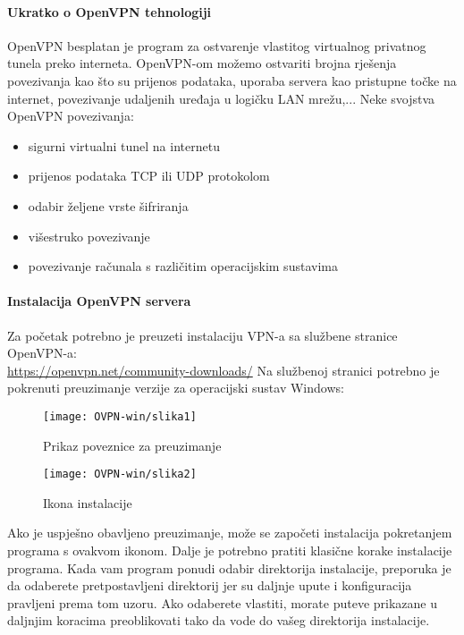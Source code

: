 \bigbreak
\paragraph*{Ukratko o OpenVPN tehnologiji}
\hfill \smallbreak

OpenVPN\cite{openvpn} besplatan je program za ostvarenje vlastitog virtualnog privatnog tunela preko interneta. OpenVPN-om možemo ostvariti brojna rješenja povezivanja kao što su prijenos podataka, uporaba servera kao pristupne točke na internet, povezivanje udaljenih uređaja u logičku LAN mrežu,...\smallbreak
Neke svojstva OpenVPN povezivanja:
\begin{itemize}
	\item sigurni virtualni tunel na internetu
	\item prijenos podataka TCP ili UDP protokolom
	\item odabir željene vrste šifriranja
	\item višestruko povezivanje
	\item povezivanje računala s različitim operacijskim sustavima
\end{itemize}

\bigbreak
\paragraph*{Instalacija OpenVPN servera}
\hfill \bigbreak
Za početak potrebno je preuzeti instalaciju VPN-a sa službene stranice OpenVPN-a:\\ \url{https://openvpn.net/community-downloads/}
\hfill \smallbreak
Na službenoj stranici potrebno je pokrenuti preuzimanje verzije za operacijski sustav Windows:
\begin{figure}[h!]
	\centering
     \texttt{[image: OVPN-win/slika1]}
     \caption{Prikaz poveznice za preuzimanje}
\end{figure}
\FloatBarrier
\begin{wrapfigure}{r}{0.4\textwidth}
  \begin{center}
    \texttt{[image: OVPN-win/slika2]}
    \caption{Ikona instalacije}
  \end{center}
\end{wrapfigure}
\FloatBarrier
Ako je uspješno obavljeno preuzimanje, može se započeti instalacija pokretanjem programa s ovakvom ikonom.
\bigbreak
Dalje je potrebno pratiti klasične korake instalacije programa. Kada vam program ponudi odabir direktorija instalacije, preporuka je da odaberete pretpostavljeni direktorij jer su daljnje upute i konfiguracija pravljeni prema tom uzoru. Ako odaberete vlastiti, morate puteve prikazane u daljnjim koracima preoblikovati tako da vode do vašeg direktorija instalacije.
\smallbreak

